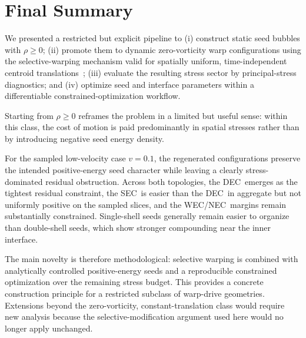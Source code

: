 \documentclass[11pt]{article}
\makeatletter
\newcommand{\@abbr}[1]{\ifmmode\mathrm{#1}\else\textsc{#1}\fi}
\newcommand{\WEC}{\@abbr{WEC}}
\newcommand{\NEC}{\@abbr{NEC}}
\newcommand{\SEC}{\@abbr{SEC}}
\newcommand{\DEC}{\@abbr{DEC}}
\makeatother
\begin{document}
\section{Final Summary}
\label{sec:conclusions}

We presented a restricted but explicit pipeline to (i) construct static seed bubbles with $\rho\ge 0$; (ii) promote them to dynamic zero-vorticity warp configurations using the selective-warping mechanism valid for spatially uniform, time-independent centroid translations~\cite{Santiago:2021aup,Schuster:2023ADMmass}; (iii) evaluate the resulting stress sector by principal-stress diagnostics; and (iv) optimize seed and interface parameters within a differentiable constrained-optimization workflow.

Starting from $\rho\ge0$ reframes the problem in a limited but useful sense: within this class, the cost of motion is paid predominantly in spatial stresses rather than by introducing negative seed energy density.

For the sampled low-velocity case $v=0.1$, the regenerated configurations preserve the intended positive-energy seed character while leaving a clearly stress-dominated residual obstruction. Across both topologies, the \DEC\ emerges as the tightest residual constraint, the \SEC\ is easier than the \DEC\ in aggregate but not uniformly positive on the sampled slices, and the \WEC/\NEC\ margins remain substantially constrained. Single-shell seeds generally remain easier to organize than double-shell seeds, which show stronger compounding near the inner interface.

The main novelty is therefore methodological: selective warping is combined with analytically controlled positive-energy seeds and a reproducible constrained optimization over the remaining stress budget. This provides a concrete construction principle for a restricted subclass of warp-drive geometries. Extensions beyond the zero-vorticity, constant-translation class would require new analysis because the selective-modification argument used here would no longer apply unchanged.

\end{document}

